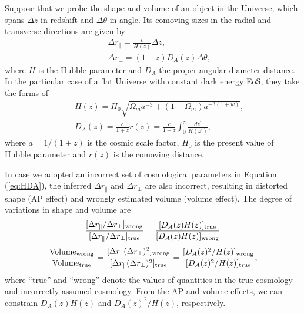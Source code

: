 \documentclass[iop]{emulateapj}
\begin{document}
Suppose that we probe the shape and volume of an object in the Universe,
which spans $\Delta z$ in redshift and $\Delta \theta$ in angle.
Its comoving sizes in the radial and transverse directions are given by
\begin{eqnarray}\label{eq:distance}
& &\Delta r_{\parallel} = \frac{c}{H(z)}\Delta z,\nonumber\\
& &\Delta r_{\bot}=(1+z)D_A(z)\Delta \theta,
\end{eqnarray}
where $H$ is the Hubble parameter and $D_A$ the proper angular diameter distance.
In the particular case of a flat Universe with constant dark energy EoS, they take the forms of
\begin{eqnarray}\label{eq:HDA}
& &H(z) = H_0\sqrt{\Omega_ma^{-3}+(1-\Omega_m)a^{-3(1+w)}},\nonumber\\
& &D_A(z) = \frac{c}{1+z}r(z)=\frac{c}{1+z}\int_0^z \frac{dz^\prime}{H(z^\prime)},
\end{eqnarray}
where $a=1/(1+z)$ is the cosmic scale factor,
$H_0$ is the present value of Hubble parameter and $r(z)$ is the comoving distance.

In case we adopted an incorrect set of cosmological parameters in Equation (\ref{eq:HDA}),
the inferred $\Delta r_{\parallel}$ and $\Delta r_{\bot}$ are also incorrect,
resulting in distorted shape (AP effect) and wrongly estimated volume (volume effect).
The degree of variations in shape and volume are
\begin{equation}\label{eq:stretch}
 \frac{[\Delta r_{\parallel}/\Delta r_{\perp}]_{\rm wrong}}{[\Delta r_{\parallel}/\Delta r_{\perp}]_{\rm true}} =
  \frac{[D_A(z)H(z)]_{\rm true}}{[D_A(z)H(z)]_{\rm wrong}} 
\end{equation}
\begin{equation}\label{eq:volume}
 \frac{{\rm Volume}_{\rm wrong}}{{\rm Volume}_{\rm true}}
 = \frac{[\Delta r_{\parallel}(\Delta r_{\perp})^{2}]_{\rm wrong}}{[\Delta r_{\parallel}(\Delta r_{\perp})^{2}]_{\rm true}}
 = \frac{[D_A(z)^2/H(z)]_{\rm wrong}}{[D_A(z)^2 / H(z)]_{\rm true}},
\end{equation}
where ``true'' and ``wrong'' denote the values of quantities in the true cosmology and incorrectly assumed cosmology.
From the AP and volume effects, we can constrain  $D_A(z)H(z)$ and $D_A(z)^2 / H(z)$, respectively.
\end{document}
